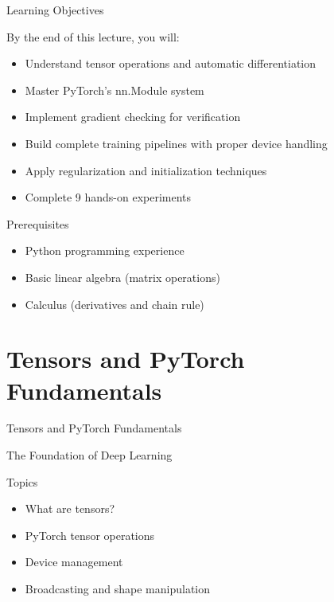 \documentclass[aspectratio=169,10pt]{beamer}
\begin{document}
\begin{frame}{Learning Objectives}
\begin{block}{By the end of this lecture, you will:}
\begin{itemize}
    \item Understand tensor operations and automatic differentiation
    \item Master PyTorch's nn.Module system
    \item Implement gradient checking for verification
    \item Build complete training pipelines with proper device handling
    \item Apply regularization and initialization techniques
    \item Complete 9 hands-on experiments
\end{itemize}
\end{block}

\begin{alertblock}{Prerequisites}
\begin{itemize}
    \item Python programming experience
    \item Basic linear algebra (matrix operations)
    \item Calculus (derivatives and chain rule)
\end{itemize}
\end{alertblock}
\end{frame}

\section{Tensors and PyTorch Fundamentals}

\begin{frame}{Tensors and PyTorch Fundamentals}
\begin{center}
\Large{The Foundation of Deep Learning}
\end{center}

\begin{block}{Topics}
\begin{itemize}
    \item What are tensors?
    \item PyTorch tensor operations
    \item Device management
    \item Broadcasting and shape manipulation
\end{itemize}
\end{block}
\end{frame}
\end{document}
